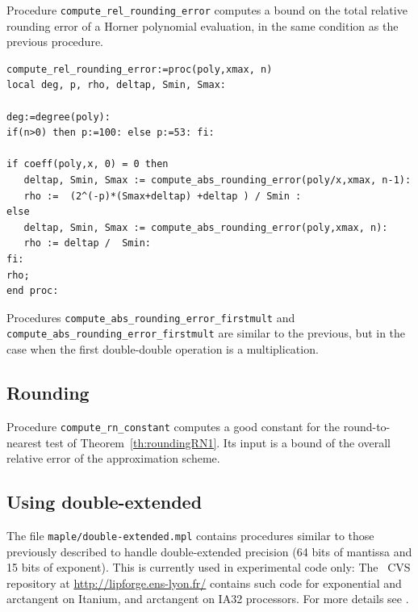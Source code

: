 Procedure \texttt{compute\_rel\_rounding\_error} computes a bound on
the total relative rounding error of a Horner polynomial evaluation,
in the same condition as the previous procedure.

\begin{lstlisting}[caption={compute\_abs\_rounding\_error},firstnumber=1]
compute_rel_rounding_error:=proc(poly,xmax, n)
local deg, p, rho, deltap, Smin, Smax:

deg:=degree(poly):
if(n>0) then p:=100: else p:=53: fi: 

if coeff(poly,x, 0) = 0 then
   deltap, Smin, Smax := compute_abs_rounding_error(poly/x,xmax, n-1):
   rho :=  (2^(-p)*(Smax+deltap) +deltap ) / Smin :
else
   deltap, Smin, Smax := compute_abs_rounding_error(poly,xmax, n):
   rho := deltap /  Smin:
fi:
rho;
end proc:
\end{lstlisting}
\vspace{0.5cm}

Procedures \texttt{compute\_abs\_rounding\_error\_firstmult} and
\texttt{compute\_abs\_rounding\_error\_firstmult} are similar to the
previous, but in the case when the first double-double operation is a
multiplication.



\subsection{Rounding}

Procedure \texttt{compute\_rn\_constant} computes a good constant for
the round-to-nearest test of Theorem~\ref{th:roundingRN1}. Its input
is a bound of the overall relative error of the approximation scheme.




\subsection{Using double-extended}

The file \texttt{maple/double-extended.mpl} contains procedures
similar to those previously described to handle double-extended
precision (64 bits of mantissa and 15 bits of exponent). This is
currently used in experimental code only: The \crlibm\ CVS repository
at \url{http://lipforge.ens-lyon.fr/} contains such code for
exponential and arctangent on Itanium, and arctangent on IA32
processors. For more details see \cite{DinDefLau2004LIP,DinErshGast2005}.




